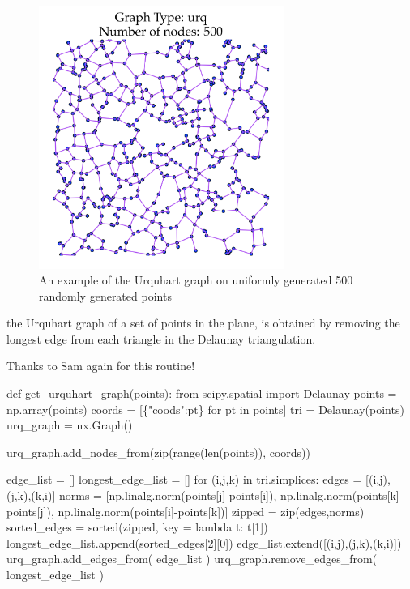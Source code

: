 \begin{figure}[ht]
  \centering
  \includegraphics[width=8cm]{./miscimages/urquhart-example.png}
  \caption{\label{fig:urquhart-example} An example of the Urquhart graph on uniformly generated 500 randomly generated points}
\end{figure}

the Urquhart graph of a set of points in the plane, is obtained by removing the longest edge from each triangle in the Delaunay triangulation.

Thanks to Sam again for this routine!

\nwenddocs{}\plusendmoddef\nwstartdeflinemarkup{}\nwenddeflinemarkup
def get_urquhart_graph(points):
     from scipy.spatial import Delaunay
     points       = np.array(points)
     coords       = [\{"coods":pt\} for pt in points]
     tri          = Delaunay(points)
     urq_graph = nx.Graph()

     urq_graph.add_nodes_from(zip(range(len(points)), coords))

     edge_list = []
     longest_edge_list = []
     for (i,j,k) in tri.simplices:
         edges = [(i,j),(j,k),(k,i)]
         norms = [np.linalg.norm(points[j]-points[i]),
                  np.linalg.norm(points[k]-points[j]),
                  np.linalg.norm(points[i]-points[k])]
         zipped = zip(edges,norms)
         sorted_edges = sorted(zipped, key = lambda t: t[1])
         longest_edge_list.append(sorted_edges[2][0])
         edge_list.extend([(i,j),(j,k),(k,i)])    
     urq_graph.add_edges_from( edge_list )
     urq_graph.remove_edges_from( longest_edge_list )
     
